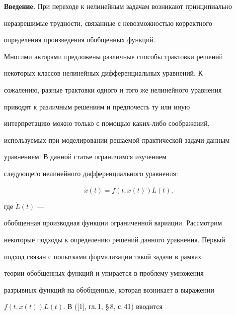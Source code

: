 

\maketitle


\label{begin}











{\bf Введение.} При переходе к нелинейным задачам возникают принципиально


неразрешимые трудности, связанные с невозможностью корректного


определения произведения обобщенных функций.


Многими авторами предложены различные способы трактовки решений


некоторых классов нелинейных дифференциальных уравнений. К


сожалению, разные трактовки одного и того же нелинейного уравнения


приводят к различным решениям и предпочесть ту или иную


интерпретацию можно только с помощью каких-либо соображений,


используемых при моделировании решаемой практической задачи данным


уравнением. В данной статье ограничимся изучением


следующего нелинейного дифференциального уравнения:


\begin{equation}


\Dot{x}(t)=f(t,x(t))\Dot{L}(t),


\end{equation}


где $\Dot{L}(t)$ ---


обобщенная производная функции ограниченной вариации. Рассмотрим


некоторые подходы к определению решений данного уравнения. Первый


подход связан с попытками формализации такой задачи в рамках


теории обобщенных функций и упирается в проблему умножения


разрывных функций на обобщенные, которая возникает в выражении


$f(t,x(t))\Dot{L}(t)$. В ([1], гл.\,1, \S\,8, с.\,41) вводится


